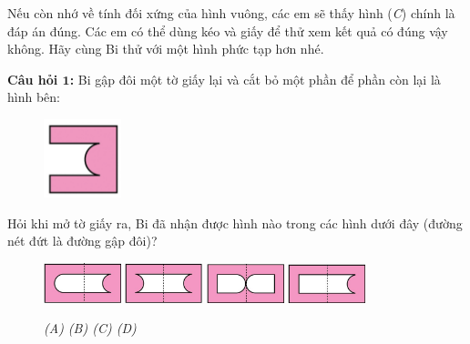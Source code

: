 Nếu còn nhớ về  tính đối xứng của hình vuông, các em sẽ thấy hình (\textit{C}) chính là đáp án đúng. Các em có thể dùng kéo và giấy để thử xem kết quả có đúng vậy không. Hãy cùng Bi thử với một hình phức tạp hơn nhé.
\vskip 0.1cm
\begin{multicols}{2}
	\textbf{Câu hỏi $\pmb{1}$:} Bi gập đôi một tờ giấy lại và cắt bỏ một phần để phần còn lại là hình bên:
	
	\columnbreak
	\begin{figure}[H]
		\centering
		\captionsetup{labelformat=empty}
		\vspace*{-5pt}
		\captionsetup{justification=centering}
		\includegraphics[width =0.2\textwidth]{cat-3}
		\vspace*{-10pt}
	\end{figure}
\end{multicols}
Hỏi khi mở tờ giấy ra, Bi đã nhận được hình nào trong các hình dưới đây (đường nét đứt là đường gập đôi)?
\begin{figure}[H]
	\centering
	\captionsetup{labelformat=empty}
	\vspace*{-5pt}
	\captionsetup{justification=centering}
	\includegraphics[width =0.2\textwidth]{cat-3a.jpeg}\quad
	\includegraphics[width =0.2\textwidth]{cat-3b.jpeg}\quad
	\includegraphics[width =0.2\textwidth]{cat-3c.jpeg}\quad
	\includegraphics[width =0.2\textwidth]{cat-3d.jpeg}
	\caption{\small\textit{(A) \hspace*{55pt} (B) \hspace*{55pt}(C) \hspace*{55pt} (D)}}
	\vspace*{-10pt}
\end{figure}
